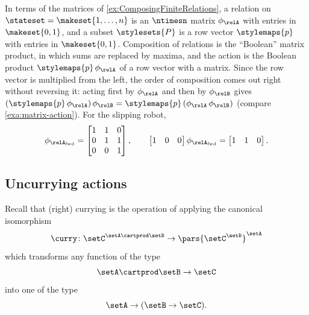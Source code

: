 \begin{example}
    In terms of the matrices of \cref{ex:ComposingFiniteRelations}, a relation on $\stateset = \makeset{1, \dots, n}$ is an $\ntimesn$ matrix $\phi_{\relA}$ with entries in $\makeset{0, 1}$, and a subset $\stylesets{P}$ is a row vector $\stylemaps{p}$ with entries in $\makeset{0, 1}$.
    Composition of relations is the ``Boolean'' matrix product, in which sums are replaced by maxima, and the action is the Boolean product $\stylemaps{p} \, \phi_{\relA}$ of a row vector with a matrix.
    Since the row vector is multiplied from the left, the order of composition comes out right without reversing it: acting first by $\phi_{\relA}$ and then by $\phi_{\relB}$ gives $(\stylemaps{p} \, \phi_{\relA}) \, \phi_{\relB} = \stylemaps{p} \, (\phi_{\relA} \, \phi_{\relB})$ (compare \cref{exa:matrix-action}).
    For the slipping robot,
    \begin{equation}
        \phi_{\relA_{\text{fwd}}} = \begin{bmatrix} 1 & 1 & 0 \\ 0 & 1 & 1 \\ 0 & 0 & 1 \end{bmatrix},
        \qquad
        \begin{bmatrix} 1 & 0 & 0 \end{bmatrix} \phi_{\relA_{\text{fwd}}} = \begin{bmatrix} 1 & 1 & 0 \end{bmatrix}.
    \end{equation}
\end{example}






\subsection{Uncurrying actions}

Recall that (right) currying is the operation of applying the canonical isomorphism
\begin{equation}
    \curry \colon \setC^{\setA \cartprod \setB} \to \pars{\setC^\setB}^\setA
\end{equation}
which transforms any function of the type
\begin{equation}
    \setA \cartprod \setB \to \setC
\end{equation}
into one of the type
\begin{equation}
   \setA \to (\setB \to \setC).
\end{equation}

